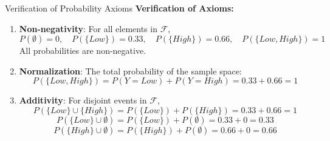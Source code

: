 \documentclass[xcolor=svgnames,t]{beamer}
\begin{document}
\begin{frame}{Verification of Probability Axioms}
    \textbf{Verification of Axioms:}
    \begin{enumerate}[<+->]
      \item \textbf{Non-negativity}: For all elements in \( \mathcal{F} \),
      \[
      P(\emptyset) = 0, \quad P(\{Low\}) = 0.33, \quad P(\{High\}) = 0.66, \quad P(\{Low, High\}) = 1
      \]
      All probabilities are non-negative.
      
      \item \textbf{Normalization}: The total probability of the sample space:
      \[
      P(\{Low, High\}) = P(Y = Low) + P(Y = High) = 0.33 + 0.66 = 1
      \]
      
      \item \textbf{Additivity}: For disjoint events in \( \mathcal{F} \),
      \[
      P(\{Low\} \cup \{High\}) = P(\{Low\}) + P(\{High\}) = 0.33 + 0.66 = 1
      \]
      \[
      P(\{Low\} \cup \emptyset) = P(\{Low\}) + P(\emptyset) = 0.33 + 0 = 0.33
      \]
      \[
      P(\{High\} \cup \emptyset) = P(\{High\}) + P(\emptyset) = 0.66 + 0 = 0.66
      \]
    \end{enumerate}
\end{frame}
\end{document}
